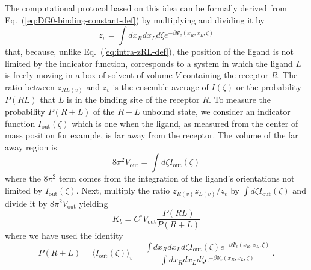 \documentclass[9pt,bestpractices,pubversion]{livecoms}
\begin{document}
The computational protocol based on this idea can be formally derived from Eq.~(\ref{eq:DG0-binding-constant-def}) by multiplying and dividing it by
\begin{equation}
z_v = \int dx_R dx_L d\zeta e^{-\beta \Psi_v(x_R, x_L, \zeta)}
\end{equation}
that, because, unlike Eq.~(\ref{eq:intra-zRL-def}), the position of the ligand is not limited by the indicator function, corresponds to a system in which the ligand $L$ is freely moving in a box of solvent of volume $V$ containing the receptor $R$. The ratio between $z_{RL(v)}$ and $z_v$ is the ensemble average of $I(\zeta)$ or the probability $P(RL)$ that $L$ is in the binding site of the receptor $R$. To measure the probability $P(R+L)$ of the $R+L$ unbound state, we consider an indicator function $I_{\mathrm{out}}(\zeta)$ which is one when the ligand, as measured from the center of mass position for example, is far away from the receptor. The volume of the far away region is
\begin{equation}
8 \pi^2 V_{\mathrm{out}} = \int d\zeta I_{\mathrm{out}}(\zeta)
\end{equation}
where the $8 \pi^2$ term comes from the integration of the ligand's orientations not limited by $I_{\mathrm{out}}(\zeta)$. Next, multiply the ratio $z_{R(v)} z_{L(v)}/z_v$ by $\int d\zeta I_{\mathrm{out}}(\zeta)$ and divide it by $8 \pi^2 V_{\mathrm{out}}$ yielding
\begin{equation}
K_b = C^\circ V_{\mathrm{out}} \frac{P(RL)}{P(R+L)}
\end{equation}
where we have used the identity
\begin{equation}
P(R+L) = \langle I_{\mathrm{out}}(\zeta) \rangle_v = \frac{\int dx_R dx_L d\zeta I_{\mathrm{out}}(\zeta) e^{-\beta \Psi_v(x_R, x_L, \zeta)}}{\int dx_R dx_L d\zeta e^{-\beta \Psi_v(x_R, x_L, \zeta)}} \, .
\end{equation}
\end{document}
